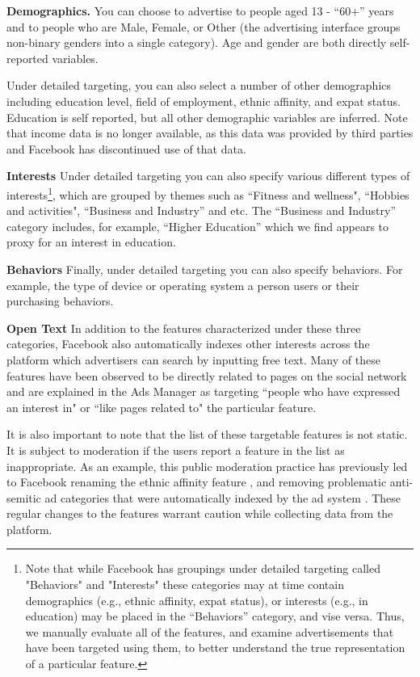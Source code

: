 \textbf{Demographics.} You can choose to advertise to people aged 13 - ``60+'' years and to people who are Male, Female, or Other (the advertising interface groups non-binary genders into a single category). Age and gender are both directly self-reported variables. 

Under detailed targeting, you can also select a number of other demographics including education level, field of employment, ethnic affinity, and expat status. Education is self reported, but all other demographic variables are inferred. Note that income data is no longer available, as this data was provided by third parties and Facebook has discontinued use of that data.

\textbf{Interests} Under detailed targeting you can also specify various different types of interests\footnote{Note that while Facebook has groupings under detailed targeting called "Behaviors" and "Interests" these categories may at time contain demographics (e.g., ethnic affinity, expat status), or interests (e.g., in education) may be placed in the ``Behaviors'' category, and vise versa. Thus, we manually evaluate all of the features, and examine advertisements that have been targeted using them, to better understand the true representation of a particular feature.}, which are grouped by themes such as ``Fitness and wellness", ``Hobbies and activities", ``Business and Industry'' and etc. The ``Business and Industry'' category includes, for example, ``Higher Education'' which we find appears to proxy for an interest in education.

\textbf{Behaviors} Finally, under detailed targeting you can also specify behaviors. For example, the type of device or operating system a person users or their purchasing behaviors.

\textbf{Open Text} In addition to the features characterized under these three categories, Facebook also automatically indexes other interests across the platform which advertisers can search by inputting free text. Many of these features have been observed to be directly related to pages on the social network and are explained in the Ads Manager as targeting ``people who have expressed an interest in" or ``like pages related to" the particular feature.

It is also important to note that the list of these targetable features is not static. It is subject to moderation if the users report a feature in the list as inappropriate. As an example, this public moderation practice has previously led to Facebook renaming the ethnic affinity feature%
, and removing problematic anti-semitic ad categories that were automatically indexed by the ad system%
. These regular changes to the features warrant caution while collecting data from the platform.

